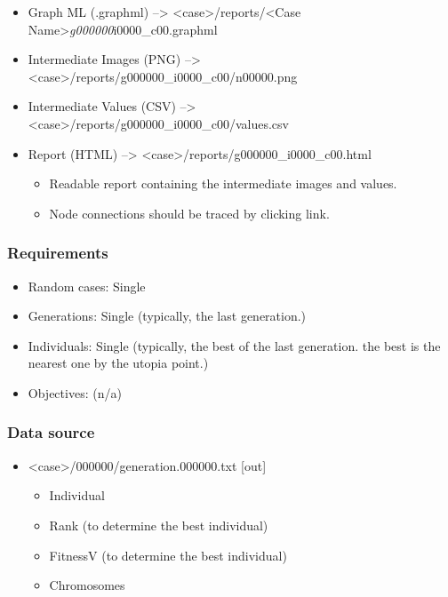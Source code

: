 \documentclass[]{article}
\begin{document}
\begin{itemize}
\itemsep1pt\parskip0pt
\item
  Graph ML (.graphml) --\textgreater{}
  \textless{}case\textgreater{}/reports/\textless{}Case
  Name\textgreater{}\emph{g000000}i0000\_c00.graphml
\item
  Intermediate Images (PNG) --\textgreater{}
  \textless{}case\textgreater{}/reports/g000000\_i0000\_c00/n00000.png
\item
  Intermediate Values (CSV) --\textgreater{}
  \textless{}case\textgreater{}/reports/g000000\_i0000\_c00/values.csv
\item
  Report (HTML) --\textgreater{}
  \textless{}case\textgreater{}/reports/g000000\_i0000\_c00.html

  \begin{itemize}
  \itemsep1pt\parskip0pt
  \item
    Readable report containing the intermediate images and values.
  \item
    Node connections should be traced by clicking link.
  \end{itemize}
\end{itemize}

\subsubsection{Requirements}\label{requirements-4}

\begin{itemize}
\itemsep1pt\parskip0pt
\item
  Random cases: Single
\item
  Generations: Single (typically, the last generation.)
\item
  Individuals: Single (typically, the best of the last generation. the
  best is the nearest one by the utopia point.)
\item
  Objectives: (n/a)
\end{itemize}

\subsubsection{Data source}\label{data-source-4}

\begin{itemize}
\itemsep1pt\parskip0pt
\item
  \textless{}case\textgreater{}/000000/generation.000000.txt {[}out{]}

  \begin{itemize}
  \itemsep1pt\parskip0pt
  \item
    Individual
  \item
    Rank (to determine the best individual)
  \item
    FitnessV (to determine the best individual)
  \item
    Chromosomes
  \end{itemize}
\end{itemize}
\end{document}
